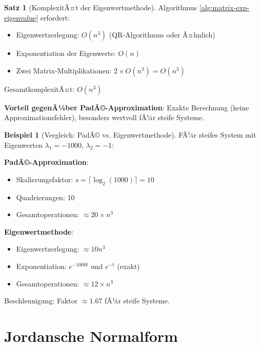 ﻿\documentclass[a4paper,12pt]{report}
\theoremstyle{definition}
\newtheorem{beispiel}{Beispiel}
\newtheorem{satz}{Satz}
\begin{document}
	\begin{satz}[KomplexitÃ¤t der Eigenwertmethode]
		Algorithmus \ref{alg:matrix-exp-eigenvalue} erfordert:
		\begin{itemize}
			\item Eigenwertzerlegung: $O(n^3)$ (QR-Algorithmus oder Ã¤hnlich)
			\item Exponentiation der Eigenwerte: $O(n)$
			\item Zwei Matrix-Multiplikationen: $2 \times O(n^3) = O(n^3)$
		\end{itemize}
		
		GesamtkomplexitÃ¤t: $O(n^3)$
		
		\textbf{Vorteil gegenÃ¼ber PadÃ©-Approximation}: Exakte Berechnung (keine Approximationsfehler), besonders wertvoll fÃ¼r steife Systeme.
	\end{satz}
	
	\begin{beispiel}[Vergleich: PadÃ© vs. Eigenwertmethode]
		FÃ¼r steifes System mit Eigenwerten $\lambda_1 = -1000$, $\lambda_2 = -1$:
		
		\textbf{PadÃ©-Approximation}:
		\begin{itemize}
			\item Skalierungsfaktor: $s = \lceil \log_2(1000) \rceil = 10$
			\item Quadrierungen: 10
			\item Gesamtoperationen: $\approx 20 \times n^3$
		\end{itemize}
		
		\textbf{Eigenwertmethode}:
		\begin{itemize}
			\item Eigenwertzerlegung: $\approx 10 n^3$
			\item Exponentiation: $e^{-1000t}$ und $e^{-t}$ (exakt)
			\item Gesamtoperationen: $\approx 12 \times n^3$
		\end{itemize}
		
		Beschleunigung: Faktor $\approx 1.67$ fÃ¼r steife Systeme.
	\end{beispiel}
	
	\section{Jordansche Normalform}
	
\end{document}
